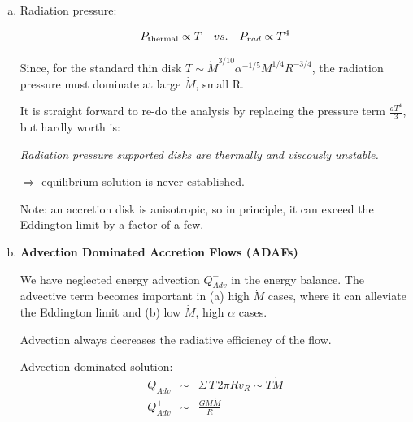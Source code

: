 \begin{enumerate}[a)]
   \item Radiation pressure:
   
\begin{equation}
   P_{\rm thermal} \propto T ~~~ vs. ~~~ P_{rad} \propto T^{4}
\end{equation}
   
Since, for the standard thin disk $T \sim \dot{M}^{3/10} \alpha^{-1/5} M^{1/4} R^{-3/4}$, the radiation 
pressure must dominate at large $\dot{M}$, small R.

It is straight forward to re-do the analysis by replacing the pressure term $\frac{a T^{4}}{3}$, but 
hardly worth is:

\textit{Radiation pressure supported disks are thermally and viscously unstable.}

$\Rightarrow$ equilibrium solution is never established.

Note: an accretion disk is anisotropic, so in principle, it can exceed the Eddington limit by a factor of a few.

   \item \textbf{Advection Dominated Accretion Flows (ADAFs)}

We have neglected energy advection $Q_{Adv}^{-}$ in the energy balance. The advective term becomes important
in (a) high $\dot{M}$ cases, where it can alleviate the Eddington limit and (b) low $\dot{M}$, high $\alpha$ cases.

Advection always decreases the radiative efficiency of the flow.

Advection dominated solution:
\begin{eqnarray}
   Q_{Adv}^{-} &\sim& \Sigma\,T\, 2\pi R v_{R} \sim T \dot{M} \\
   Q_{Adv}^{+} &\sim& \frac{G M \dot{M}}{R}
\end{eqnarray}


\end{enumerate}
